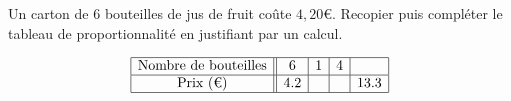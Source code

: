 
\begin{exercice}\label{exo2smath-0120}

Un carton de $6$ bouteilles de jus de fruit coûte $4,20$€. Recopier puis compléter le tableau de proportionnalité en justifiant par un calcul.  

\begin{equation*}
    \begin{array}[]{|c||c|c|c|c|}
        \hline
        \text{Nombre de bouteilles}&6&1&4&\\
        \hline
        \text{Prix (€)}&4.2&&&13.3\\
        \hline
    \end{array}
\end{equation*}

\end{exercice}
